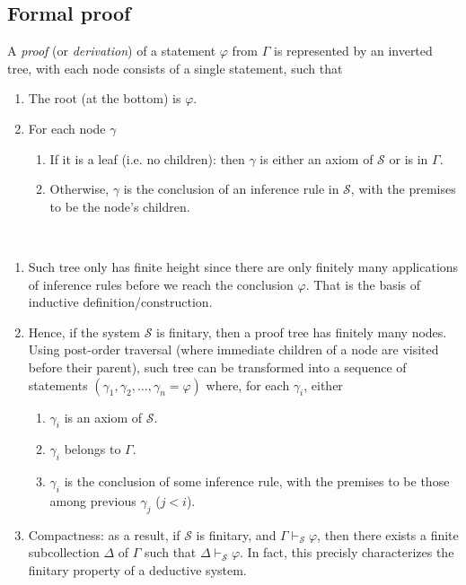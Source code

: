 \documentclass{treatise}
\begin{document}
\begin{shaded}
\section{Formal proof}
A \emph{proof} (or \emph{derivation}) of a statement $\varphi$ from $\Gamma$ is represented by an inverted tree, with each node consists of a single statement, such that
\begin{enumerate}
    \item The root (at the bottom) is $\varphi$.
    \item For each node $\gamma$
    \begin{enumerate}
        \item If it is a leaf (i.e. no children): then $\gamma$ is either an axiom of $\mathcal{S}$ or is in $\Gamma$.
        \item Otherwise, $\gamma$ is the conclusion of an inference rule in $\mathcal{S}$, with the premises to be the node's children.
    \end{enumerate}
\end{enumerate}
\begin{remark} \ 
\begin{enumerate}
    \item Such tree only has finite height since there are only finitely many applications of inference rules before we reach the conclusion $\varphi$. That is the basis of inductive definition/construction.
    \item Hence, if the system $\mathcal{S}$ is finitary, then a proof tree has finitely many nodes. Using post-order traversal (where immediate children of a node are visited before their parent), such tree can be transformed into a sequence of statements $(\gamma_1, \gamma_2, \hdots, \gamma_n = \varphi)$ where, for each $\gamma_i$, either
    \begin{enumerate}
        \item $\gamma_i$ is an axiom of $\mathcal{S}$.
        \item $\gamma_i$ belongs to $\Gamma$.
        \item $\gamma_i$ is the conclusion of some inference rule, with the premises to be those among previous $\gamma_j$ ($j < i$). 
    \end{enumerate}
    \item Compactness: as a result, if $\mathcal{S}$ is finitary, and $\Gamma \vdash_{\mathcal{S}} \varphi$, then there exists a finite subcollection $\Delta$ of $\Gamma$ such that $\Delta \vdash_{\mathcal{S}} \varphi$. In fact, this precisly characterizes the finitary property of a deductive system.

\end{enumerate}
\end{remark}
\end{shaded}
\end{document}
